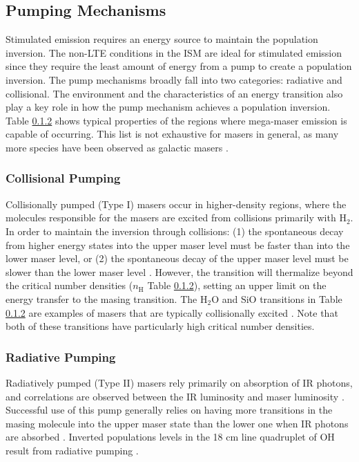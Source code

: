\subsection{Pumping Mechanisms}
\label{sub:pumping}

Stimulated emission requires an energy source to maintain the population inversion.  The non-LTE conditions in the ISM are ideal for stimulated emission since they require the least amount of energy from a pump to create a population inversion.  The pump mechanisms broadly fall into two categories: radiative and collisional.  The environment and the characteristics of an energy transition also play a key role in how the pump mechanism achieves a population inversion.  Table \ref{subsub:rad_pump} shows typical properties of the regions where mega-maser emission is capable of occurring.  This list is not exhaustive for masers in general, as many more species have been observed as galactic masers \citep[][e.g., ]{Elitzur_1992_review}. 

\subsubsection{Collisional Pumping}
\label{subsub:coll_pump}

Collisionally pumped (Type I) masers occur in higher-density regions, where the molecules responsible for the masers are excited from collisions primarily with H$_2$. In order to maintain the inversion through collisions: (1) the spontaneous decay from higher energy states into the upper maser level must be faster than into the lower maser level, or (2) the spontaneous decay of the upper maser level must be slower than the lower maser level \citep{Goldreich_1974}. However, the transition will thermalize beyond the critical number densities ($n_{\mathrm{H}}$ Table \ref{subsub:rad_pump}), setting an upper limit on the energy transfer to the masing transition.  The H$_2$O and SiO transitions in Table \ref{subsub:rad_pump} are examples of masers that are typically collisionally excited \citep{Elitzur_1992}. Note that both of these transitions have particularly high critical number densities.

\subsubsection{Radiative Pumping}
\label{subsub:rad_pump}

Radiatively pumped (Type II) masers rely primarily on absorption of IR photons, and correlations are observed between the IR luminosity and maser luminosity \citep{darling2002_paperIII}. Successful use of this pump generally relies on having more transitions in the masing molecule  into the upper maser state than the lower one when IR photons are absorbed \citep{lo2005}. Inverted populations levels in the 18 cm line quadruplet of OH result from radiative pumping \citep[][see \S XXX ADD NUM XXX for more on the OH transitions]{Elitzur_1992, lo2005}. 


